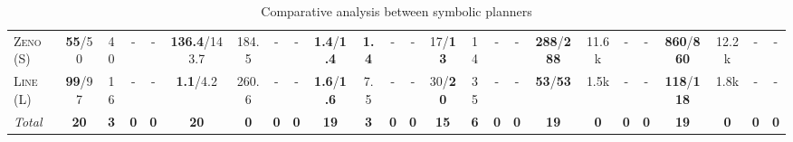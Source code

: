 \documentclass[11pt,landscape]{article}
\begin{document}
\begin{table*}[tb]
{\begin{tabular}{|l||cccc||cccc||cccc||cccc||cccc||cccc||}
\textsc{Zeno} (S)&\textbf{55}/50&40&-&-&\textbf{136.4}/143.7&184.5&-&-&\textbf{1.4}/\textbf{1.4}&\textbf{1.4}&-&-&17/\textbf{13}&14&-&-&\textbf{288}/\textbf{288}&11.6k&-&-&\textbf{860}/\textbf{860}&12.2k&-&-\\
\textsc{Line} (L)&\textbf{99}/97&16&-&-&\textbf{1.1}/4.2&260.6&-&-&\textbf{1.6}/\textbf{1.6}&7.5&-&-&30/\textbf{20}&35&-&-&\textbf{53}/\textbf{53}&1.5k&-&-&\textbf{118}/\textbf{118}&1.8k&-&-
\\\hline
\textit{Total}&\textbf{20}&\textbf{3}&\textbf{0}&\textbf{0}&\textbf{20}&\textbf{0}&\textbf{0}&\textbf{0}&\textbf{19}&\textbf{3}&\textbf{0}&\textbf{0}&\textbf{15}&\textbf{6}&\textbf{0}&\textbf{0}&\textbf{19}&\textbf{0}&\textbf{0}&\textbf{0}&\textbf{19}&\textbf{0}&\textbf{0}&\textbf{0}\\\hline

        \end{tabular}}
        \caption{Comparative analysis between symbolic planners}
        \label{tab:symbolic}
        \end{table*}
        
\end{document}
